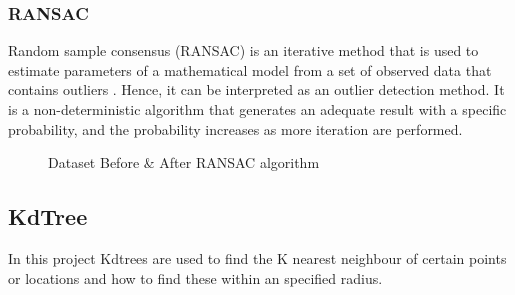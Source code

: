 \documentclass[12pt]{report}
\begin{document}
\subsubsection{RANSAC}
\label{section:ransac}
Random sample consensus (RANSAC) is an iterative method that is used to estimate parameters of a mathematical model from a set of observed data that contains outliers .
Hence, it can be interpreted as an outlier detection method. It is a non-deterministic algorithm that generates an adequate result with a specific probability, and the probability increases as more iteration are performed.

\begin{figure}[H]%
  \centering
  \qquad
  \caption{Dataset Before \& After RANSAC algorithm }%
  \label{fig:example}%
\end{figure}






\subsection {KdTree}
\label{section:KdTree}
In this project Kdtrees are used to find the K nearest neighbour of certain points or locations and how to find these within an specified radius.
\end{document}
